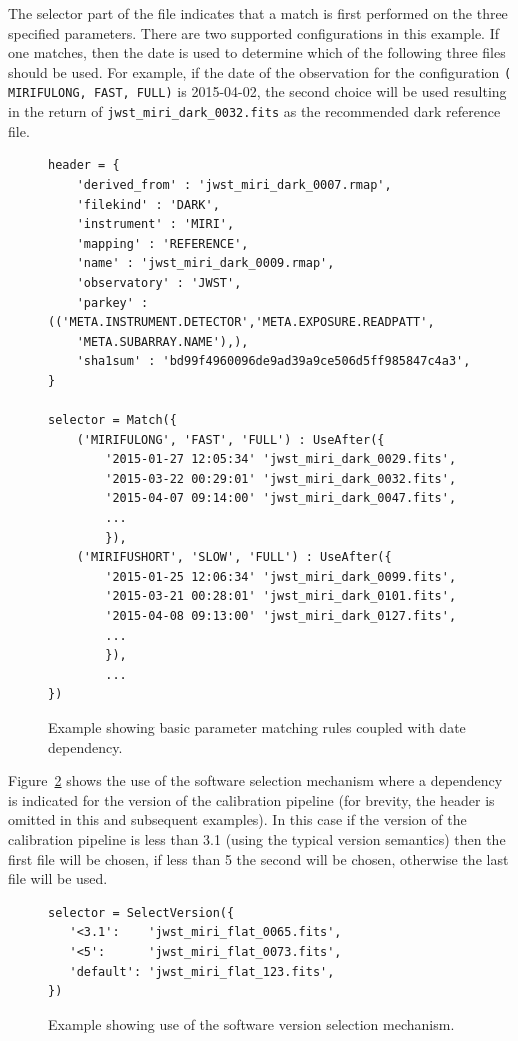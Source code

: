 \documentclass[final,authoryear,5p,times,twocolumn]{elsarticle}
\begin{document}
The selector part of the file indicates that a match is first performed on the 
three specified parameters. There are two supported configurations in this example.
If one matches, then the date is used to determine which of the following three files
should be used.
For example, if the date of the observation for the configuration {\tt (\textquotesingle 
MIRIFULONG\textquotesingle , \textquotesingle FAST\textquotesingle , 
\textquotesingle FULL\textquotesingle )} is 2015-04-02, the second choice 
will be used resulting in the return of {\tt jwst\_miri\_dark\_0032.fits} 
as the recommended dark reference file.


\begin{figure}[ht!]
\begin{verbatim}
header = {
    'derived_from' : 'jwst_miri_dark_0007.rmap',
    'filekind' : 'DARK',
    'instrument' : 'MIRI',
    'mapping' : 'REFERENCE',
    'name' : 'jwst_miri_dark_0009.rmap',
    'observatory' : 'JWST',
    'parkey' : (('META.INSTRUMENT.DETECTOR','META.EXPOSURE.READPATT',
    'META.SUBARRAY.NAME'),),
    'sha1sum' : 'bd99f4960096de9ad39a9ce506d5ff985847c4a3',
}

selector = Match({
    ('MIRIFULONG', 'FAST', 'FULL') : UseAfter({
        '2015-01-27 12:05:34' 'jwst_miri_dark_0029.fits',
        '2015-03-22 00:29:01' 'jwst_miri_dark_0032.fits',
        '2015-04-07 09:14:00' 'jwst_miri_dark_0047.fits',
        ...
        }),
    ('MIRIFUSHORT', 'SLOW', 'FULL') : UseAfter({
        '2015-01-25 12:06:34' 'jwst_miri_dark_0099.fits',
        '2015-03-21 00:28:01' 'jwst_miri_dark_0101.fits',
        '2015-04-08 09:13:00' 'jwst_miri_dark_0127.fits',
        ...
        }),
        ...
})
\end{verbatim}
\caption{Example showing basic parameter matching rules coupled with date dependency.}
\label{fig:example1}
\end{figure}

Figure~\ref{fig:example2} shows the use of the software selection mechanism where a dependency is indicated for the version of the calibration pipeline (for brevity, the header is omitted in this and subsequent examples). In this case if the version of the calibration pipeline is less than 3.1 (using the typical version semantics) then the first file will be chosen, if less than 5 the second will be chosen, otherwise the last file will be used.

\begin{figure}
\begin{verbatim}
selector = SelectVersion({
   '<3.1':    'jwst_miri_flat_0065.fits',
   '<5':      'jwst_miri_flat_0073.fits',
   'default': 'jwst_miri_flat_123.fits',
})
\end{verbatim}
\caption{Example showing use of the software version selection mechanism.}
\label{fig:example2}
\end{figure}
\end{document}
